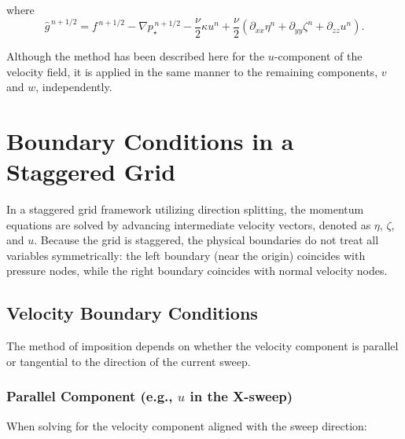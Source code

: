 \documentclass[12pt]{article}
\begin{document}
where
\[
\hat g^{\,n+1/2} = f^{\,n+1/2} - \nabla p^{\,n+1/2}_\star 
- \frac{\nu}{2} \kappa u^n + \frac{\nu}{2} (\partial_{xx} \eta^n + \partial_{yy} \zeta^n + \partial_{zz} u^n).
\]

Although the method has been described here for the \(u\)-component of the velocity field, 
it is applied in the same manner to the remaining components, \(v\) and \(w\), independently.


\section{Boundary Conditions in a Staggered Grid}

In a staggered grid framework utilizing direction splitting, the momentum equations are solved by advancing intermediate velocity vectors, denoted as $\eta$, $\zeta$, and $u$. Because the grid is staggered, the physical boundaries do not treat all variables symmetrically: the left boundary (near the origin) coincides with pressure nodes, while the right boundary coincides with normal velocity nodes.

\subsection{Velocity Boundary Conditions}

The method of imposition depends on whether the velocity component is parallel or tangential to the direction of the current sweep.

\subsubsection{Parallel Component (e.g., $u$ in the X-sweep)}
When solving for the velocity component aligned with the sweep direction:
\end{document}
